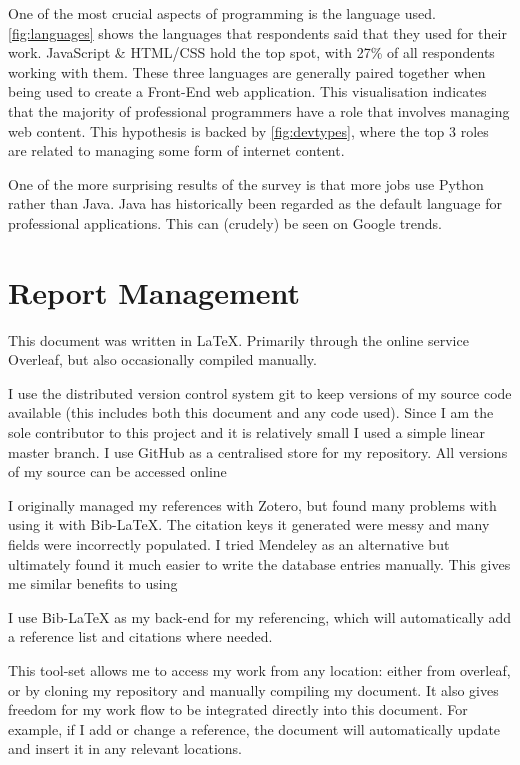 \documentclass[listof=totoc]{scrartcl}
\begin{document}
One of the most crucial aspects of programming is the language used. \autoref{fig:languages} shows the languages that respondents said that they used for their work. JavaScript \& HTML/CSS hold the top spot, with 27\% of all respondents working with them. These three languages are generally paired together when being used to create a Front-End web application. This visualisation indicates that the majority of professional programmers have a role that involves managing web content. This hypothesis is backed by \autoref{fig:devtypes}, where the top 3 roles are related to managing some form of internet content.

One of the more surprising results of the survey is that more jobs use Python rather than Java. Java has historically been regarded as the default language for professional applications. This can (crudely) be seen on Google trends\cite{TrendsPythonVsJava}.

\section{Report Management}
This document was written in \LaTeX{}\autocite{LaTeX}. Primarily through the online service Overleaf, but also occasionally compiled manually.

I use the distributed version control system git\autocite{git} to keep versions of my source code available (this includes both this document and any code used). Since I am the sole contributor to this project and it is relatively small I used a simple linear master branch. I use GitHub as a centralised store for my repository. All versions of my source can be accessed online\autocite{repo}

I originally managed my references with Zotero, but found many problems with using it with Bib-\LaTeX{}. The citation keys it generated were messy and many fields were incorrectly populated. I tried Mendeley as an alternative but ultimately found it much easier to write the database entries manually. This gives me similar benefits to using

I use Bib-\LaTeX{} as my back-end for my referencing, which will automatically add a reference list and citations where needed.

This tool-set allows me to access my work from any location: either from overleaf, or by cloning my repository and manually compiling my document. It also gives freedom for my work flow to be integrated directly into this document. For example, if I add or change a reference, the document will automatically update and insert it in any relevant locations.

\printbibliography
\end{document}
